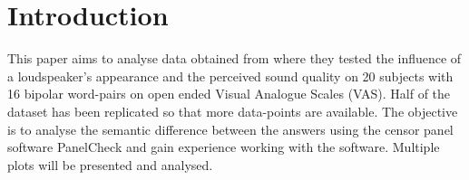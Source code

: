 \chapter*{Introduction}
\label{introduction}
This paper aims to analyse data obtained from \cite{Christiansen2011} where they tested the influence of a loudspeaker's appearance and the perceived sound quality on 20 subjects with 16 bipolar word-pairs on open ended Visual Analogue Scales (VAS). Half of the dataset has been replicated so that more data-points are available. The objective is to analyse the semantic difference between the answers using the censor panel software PanelCheck and gain experience working with the software. Multiple plots will be presented and analysed.


